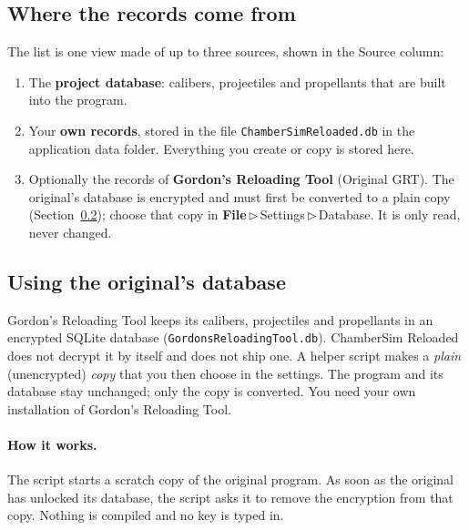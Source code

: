 \documentclass[11pt,a4paper]{article}
\newcommand{\ui}[1]{\textsf{#1}}
\newcommand{\menu}[1]{\textsf{\textbf{#1}}}
\newcommand{\sep}{\,$\triangleright$\,}
\newcommand{\file}[1]{\texttt{#1}}
\begin{document}
\subsection{Where the records come from}\label{sec:sources}
The list is one view made of up to three sources, shown in the \ui{Source} column:
\begin{enumerate}
  \item The \textbf{project database}: calibers, projectiles and propellants that are built into the program.
  \item Your \textbf{own records}, stored in the file \file{ChamberSimReloaded.db} in the application data folder. Everything you create or copy
        is stored here.
  \item Optionally the records of \textbf{Gordon's Reloading Tool} (\ui{Original GRT}). The original's database is encrypted and must first be converted to a plain copy (Section~\ref{sec:dump}); choose that copy in \menu{File}\sep\ui{Settings}\sep\ui{Database}. It is only read, never changed.
\end{enumerate}

\subsection{Using the original's database}\label{sec:dump}
Gordon's Reloading Tool keeps its calibers, projectiles and propellants in an encrypted SQLite database (\file{GordonsReloadingTool.db}). ChamberSim Reloaded does not
decrypt it by itself and does not ship one. A helper script makes a \emph{plain} (unencrypted) \emph{copy} that you then choose in the settings. The program
and its database stay unchanged; only the copy is converted. You need your own installation of Gordon's Reloading Tool.

\paragraph{How it works.} The script starts a scratch copy of the original program. As soon as the original has unlocked its database, the script asks it to
remove the encryption from that copy. Nothing is compiled and no key is typed in.
\end{document}
